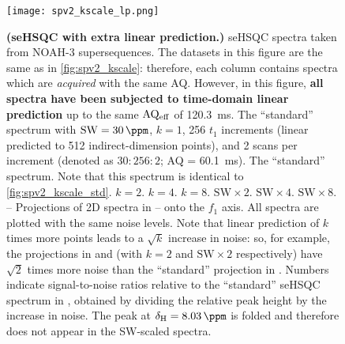 \begin{figure}
    \centering
    \texttt{[image: spv2\_kscale\_lp.png]}
    {\label{fig:spv2_kscale_lp_std}}
    {\label{fig:spv2_kscale_lp_k2}}
    {\label{fig:spv2_kscale_lp_k4}}
    {\label{fig:spv2_kscale_lp_k8}}
    {\label{fig:spv2_kscale_lp_sw2}}
    {\label{fig:spv2_kscale_lp_sw4}}
    {\label{fig:spv2_kscale_lp_sw8}}
    {\label{fig:spv2_kscale_lp_std_proj}}
    {\label{fig:spv2_kscale_lp_k2_proj}}
    {\label{fig:spv2_kscale_lp_k4_proj}}
    {\label{fig:spv2_kscale_lp_k8_proj}}
    {\label{fig:spv2_kscale_lp_sw2_proj}}
    {\label{fig:spv2_kscale_lp_sw4_proj}}
    {\label{fig:spv2_kscale_lp_sw8_proj}}
    \caption{
        \textbf{(seHSQC with extra linear prediction.)}
        \nitrogen{} seHSQC spectra taken from NOAH-3  supersequences.
        The datasets in this figure are the same as in \cref{fig:spv2_kscale}: therefore, each column contains spectra which are \textit{acquired} with the same AQ.
        However, in this figure, \textbf{all spectra have been subjected to time-domain linear prediction} up to the same $\mathrm{AQ_{eff}}$ of \SI{120.3}{\ms}.
        \textbf{} The ``standard'' spectrum with $\mathrm{SW} = \SI{30}{\ppm}$, $k = 1$, 256 $t_1$ increments (linear predicted to 512 indirect-dimension points), and 2 scans per increment (denoted as $30:256:2$; AQ = \SI{60.1}{\ms}).
        \textbf{} The ``standard'' spectrum.
        Note that this spectrum is identical to \cref{fig:spv2_kscale_std}.
        \textbf{} $k = 2$.
        \textbf{} $k = 4$.
        \textbf{} $k = 8$.
        \textbf{} $\mathrm{SW} \times 2$.
        \textbf{} $\mathrm{SW} \times 4$.
        \textbf{} $\mathrm{SW} \times 8$.
        \textbf{}--\textbf{} Projections of 2D spectra in -- onto the $f_1$ axis.
        All spectra are plotted with the same noise levels.
        Note that linear prediction of $k$ times more points leads to a $\sqrt{k}$ increase in noise: so, for example, the projections in  and  (with $k = 2$ and $\mathrm{SW \times 2}$ respectively) have $\sqrt{2}$ times more noise than the ``standard'' projection in .
        Numbers indicate signal-to-noise ratios relative to the ``standard'' seHSQC spectrum in , obtained by dividing the relative peak height by the increase in noise.
        The peak at $\delta_{\ce{H}} = \SI{8.03}{\ppm}$ is folded and therefore does not appear in the SW-scaled spectra.
        \grami{}
    }
    \label{fig:spv2_kscale_lp}
\end{figure}

